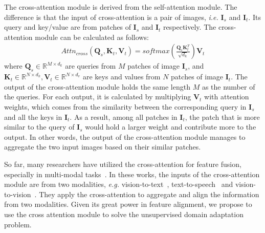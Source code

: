 \documentclass[dvipsnames, svgnames, x11names, table]{article} \usepackage{iclr2022_conference,times}
\def\mI{{\bm{I}}}
\def\mK{{\bm{K}}}
\def\mQ{{\bm{Q}}}
\def\mV{{\bm{V}}}
\begin{document}
\begin{spacing}{1.0}
The cross-attention module is derived from the self-attention module. The difference is that the input of cross-attention is a pair of images, \textit{i.e.} $\mI_s$ and $\mI_t$. Its query and key/value are from patches of $\mI_s$ and $\mI_t$ respectively. The cross-attention module can be calculated as follows:
\begin{gather}
Attn_{cross}(\mQ_s,\mK_t,\mV_t)=softmax(\frac{\mQ_s\mK_t^T}{\sqrt{d_k}})\mV_t
\label{eq:crsattn}
\end{gather}
where $\mQ_s\!\in\!\mathbb{R}^{M\times d_k}$ are queries from $M$ patches of image $\mI_s$, and $\mK_t\!\in\!\mathbb{R}^{N\times d_k},\mV_t\!\in\!\mathbb{R}^{N\times d_v}$ are keys and values from $N$ patches of image $\mI_t$. 
The output of the cross-attention module holds the same length $M$ as the number of the queries. For each output, it is calculated by multiplying $\mV_t$ with attention weights, which comes from the similarity between the corresponding query in $\mI_s$ and all the keys in $\mI_t$. As a result, among all patches in $\mI_t$, the patch that is more similar to the query of $\mI_s$ would hold a larger weight and contribute more to the output. In other words, the output of the cross-attention module manages to aggregate the two input images based on their similar patches. 


So far, many researchers have utilized the cross-attention for feature fusion, especially in multi-modal tasks~\citep{tsai2019multimodal,li2019neural,hu2021unit,li2021trear}. In these works, the inputs of the cross-attention module are from two modalities, \textit{e.g.} vision-to-text~\citep{tsai2019multimodal,hu2021unit}, text-to-speech~\citep{li2019neural} and vision-to-vision~\citep{li2021trear}. They apply the cross-attention to aggregate and align the information from two modalities. Given its great power in feature alignment, we propose to use the cross attention module to solve the unsupervised domain adaptation problem.




\end{spacing}
\end{document}

